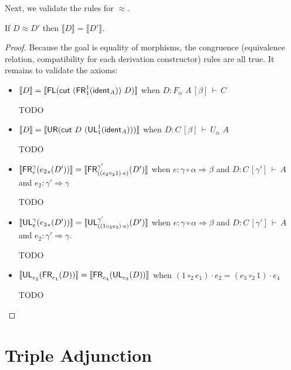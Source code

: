 \documentclass{drl-common/llncs}
\renewcommand{\sem}[1]{\ensuremath{ \llbracket #1 \rrbracket}}
\newcommand{\tc}[2]{\ensuremath{#1 \Rightarrow #2}}
\newcommand\compo[2]{\ensuremath{#1 \circ #2}}
\newcommand\compv[2]{\ensuremath{#1 \cdot #2}}
\newcommand\comph[2]{\ensuremath{#1 \mathbin{\circ_2} #2}}
\newcommand\F[2]{\ensuremath{F_{#1} \,\, #2}}
\newcommand\U[2]{\ensuremath{U_{#1} \,\, #2}}
\newcommand\seq[3]{\ensuremath{#1 \, [ #2 ] \, \vdash \, #3}}
\newcommand\tr[2]{\ensuremath{{{#1}_{*}(#2)}}}
\newcommand\ident[1]{\ensuremath{\dsd{ident}_{#1}}}
\newcommand\cut[2]{\ensuremath{{\dsd{cut} \,\, #1 \,\, #2}}}
\newcommand\UL[3]{\ensuremath{\dsd{UL}^{#1}_{#2}(#3)}}
\newcommand\FR[3]{\ensuremath{\dsd{FR}^{#1}_{#2}(#3)}}
\newcommand\FL[1]{\ensuremath{\dsd{FL}(#1)}}
\newcommand\UR[1]{\ensuremath{\dsd{UR}(#1)}}
\newcommand\ap[2]{\ensuremath{#1 \approx #2}}
\begin{document}
Next, we validate the rules for \ap{}{}.  

\begin{theorem} If \ap{D}{D'} then $\sem{D} = \sem{D'}$.  
\end{theorem}

\begin{proof}
Because the goal is equality of morphisms, the congruence (equivalence
relation, compatibility for each derivation constructor) rules are all
true.  It remains to validate the axioms:

\begin{itemize}
\item $\sem{D} = \sem{\FL {\cut{(\FR 1 1 {\ident{A}})}{D}} }$
when ${D : \seq{\F \alpha A}{\beta}{C}}$

TODO

\item $\sem{D} = \sem{\UR {\cut{D}{(\UL 1 1 {\ident{A}})}}}$
when ${D : \seq{C}{\beta}{\U \alpha A}}$

TODO

\item $\sem{{\FR{\gamma}{e}{\tr{e_2}{D'}}}} = \sem{\FR{\gamma'}{(\compv{(\comph{e_2}{1})}{e})}{D'}}$
when $e : \tc{\compo{\gamma}{\alpha}}{\beta}$
and $D : \seq{C}{\gamma'}{A}$
and $e_2 : \tc{\gamma'}{\gamma}$

TODO

\item $\sem{\UL{\gamma}{e}{\tr{e_2}{D'}}} = \sem{\UL{\gamma'}{(\compv{(\comph{1}{e_2})}{e})}{D'}}$
when $e : \tc{\compo{\gamma}{\alpha}}{\beta}$
and $D : \seq{C}{\gamma'}{A}$
and $e_2 : \tc{\gamma'}{\gamma}$.

TODO

\item $\sem{\UL {}{e_2} {\FR {} {e_1} {D}}} = \sem{\FR {} {e_4} {\UL {} {e_3} {D}}}$
when ${\compv{(\comph{1}{e_1})}{e_2} = {\compv{(\comph{e_3}{1})}{e_4}}}$

TODO

\end{itemize}
\end{proof}


\section{Triple Adjunction}
\label{sec:triple}

\end{document}
